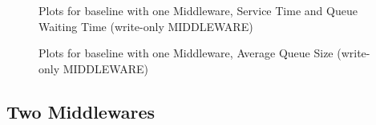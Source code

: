 \documentclass[11pt,a4paper]{article}
\begin{document}
\begin{figure}[!h]
  \centering
  \caption{Plots for baseline with one Middleware, Service Time and Queue Waiting Time (write-only MIDDLEWARE)}
  \label{fig:baseline_mw_1_mw_mw_c_wo}
\end{figure}

\begin{figure}[!h]
  \centering
    \caption{Plots for baseline with one Middleware, Average Queue Size (write-only MIDDLEWARE)}
  \label{fig:baseline_mw_1_mw_mw_qs_wo}
\end{figure}


\subsection{Two Middlewares}
\label{sec:3.2}
\end{document}
